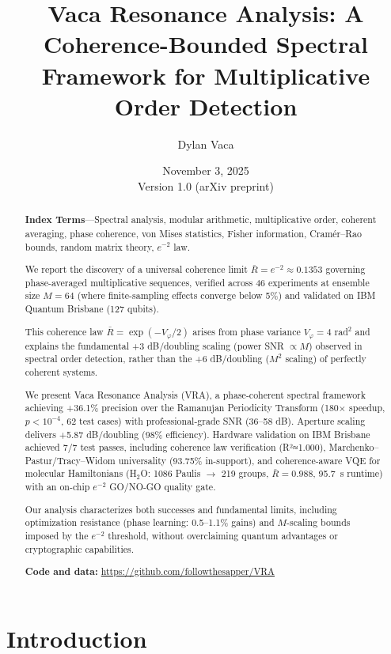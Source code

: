 \documentclass[10pt,twocolumn]{article}
\title{Vaca Resonance Analysis: A Coherence-Bounded Spectral Framework for Multiplicative Order Detection}
\author{Dylan Vaca}
\affil{Independent Researcher, CISO ProVia\\
Email: dylan.vaca@provia.com}
\date{November 3, 2025 \\ Version 1.0 (arXiv preprint)}
\begin{document}
\maketitle

\begin{abstract}
\textbf{Index Terms}---Spectral analysis, modular arithmetic, multiplicative order, coherent averaging, phase coherence, von Mises statistics, Fisher information, Cramér--Rao bounds, random matrix theory, $e^{-2}$ law.

\vspace{0.5em}

We report the discovery of a universal coherence limit $\bar{R} = e^{-2} \approx 0.1353$ governing phase-averaged multiplicative sequences, verified across 46 experiments at ensemble size $M=64$ (where finite-sampling effects converge below 5\%) and validated on IBM Quantum Brisbane (127 qubits).

This coherence law $\bar{R} = \exp(-V_\varphi/2)$ arises from phase variance $V_\varphi = 4$ rad$^2$ and explains the fundamental +3 dB/doubling scaling (power SNR $\propto M$) observed in spectral order detection, rather than the +6 dB/doubling ($M^2$ scaling) of perfectly coherent systems.

We present Vaca Resonance Analysis (VRA), a phase-coherent spectral framework achieving +36.1\% precision over the Ramanujan Periodicity Transform (180$\times$ speedup, $p < 10^{-4}$, 62 test cases) with professional-grade SNR (36--58 dB). Aperture scaling delivers +5.87 dB/doubling (98\% efficiency). Hardware validation on IBM Brisbane achieved 7/7 test passes, including coherence law verification (R²≈1.000), Marchenko--Pastur/Tracy--Widom universality (93.75\% in-support), and coherence-aware VQE for molecular Hamiltonians (H$_2$O: 1086 Paulis $\to$ 219 groups, $\bar{R} = 0.988$, 95.7~s runtime) with an on-chip $e^{-2}$ GO/NO-GO quality gate.

Our analysis characterizes both successes and fundamental limits, including optimization resistance (phase learning: 0.5--1.1\% gains) and $M$-scaling bounds imposed by the $e^{-2}$ threshold, without overclaiming quantum advantages or cryptographic capabilities.

\vspace{0.5em}
\noindent \textbf{Code and data:} \url{https://github.com/followthesapper/VRA}
\end{abstract}

\section{Introduction}
\end{document}
